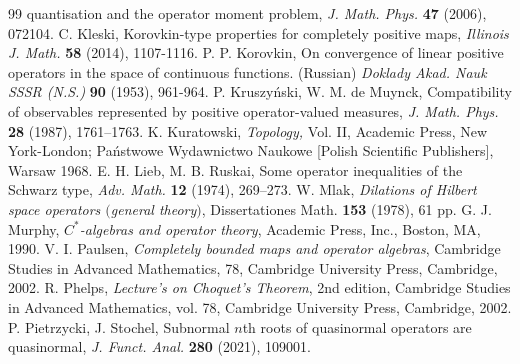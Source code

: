 \documentclass[reqno]{amsproc}
\numberwithin{equation}{section}
\theoremstyle{remark}
\theoremstyle{definition}
\begin{document}
\begin{thebibliography}{99}
quantisation and the operator moment
problem, {\em J. Math. Phys.} {\bf 47}
(2006), 072104.
C. Kleski, Korovkin-type properties for
completely positive maps, {\em Illinois J.
Math.} {\bf 58} (2014), 1107-1116.
P. P. Korovkin, On convergence of linear
positive operators in the space of
continuous functions. (Russian) {\em Doklady
Akad. Nauk SSSR (N.S.)} {\bf 90} (1953),
961-964.
P. Kruszy\'{n}ski, W. M. de Muynck,
Compatibility of observables represented by
positive operator-valued measures, {\em J.
Math. Phys.} {\bf 28} (1987), 1761--1763.
    K. Kuratowski,
{\em Topology,} Vol. II, Academic Press, New
York-London; Pa\'{n}stwowe Wydawnictwo
Naukowe [Polish Scientific Publishers],
Warsaw 1968.
E. H. Lieb, M. B. Ruskai, Some operator
inequalities of the Schwarz type, {\em Adv.
Math.} {\bf 12} (1974), 269--273.
W. Mlak, {\em Dilations of Hilbert space
operators $($general theory$)$},
Dissertationes Math. {\bf 153} (1978), 61
pp.
G. J. Murphy, {\em $C^*$-algebras and operator
theory}, Academic Press, Inc., Boston, MA, 1990.
V. I. Paulsen, {\em Completely bounded maps
and operator algebras}, Cambridge Studies in
Advanced Mathematics, 78, Cambridge
University Press, Cambridge, 2002.
    R. Phelps, {\em Lecture's on Choquet's
Theorem}, 2nd edition, Cambridge Studies in
Advanced Mathematics, vol. 78,
Cambridge University Press, Cambridge, 2002.
    P. Pietrzycki,
J. Stochel, Subnormal $n$th roots of
quasinormal operators are quasinormal, {\em
J. Funct. Anal.} {\bf 280} (2021), 109001.

\end{thebibliography}
\end{document}
